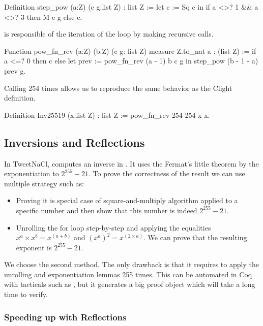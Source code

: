 \begin{coqD}
Definition step_pow (a:Z) (c g:list Z) : list Z :=
  let c := Sq c in
    if a <>? 1 && a <>? 3
    then M c g
    else c.
\end{coqD}

 is responsible of the iteration of the loop by making
recursive calls.
\begin{coqD}
Function pow_fn_rev (a:Z) (b:Z) (c g: list Z)
  {measure Z.to_nat a} : (list Z) :=
  if a <=? 0
    then c
    else
      let prev := pow_fn_rev (a - 1) b c g in
        step_pow (b - 1 - a) prev g.
\end{coqD}


Calling  254 times allows us to reproduce the same behavior as
the Clight definition.
\begin{coqD}
Definition Inv25519 (x:list Z) : list Z :=
  pow_fn_rev 254 254 x x.
\end{coqD}

\subsection{Inversions and Reflections}

In TweetNaCl,  computes an inverse in \Zfield. It uses the
Fermat's little theorem by the exponentiation to $2^{255}-21$. To prove the
correctness of the result we can use multiple strategy such as:
\begin{itemize}
  \item Proving it is special case of square-and-multiply algorithm applied to
  a specific number and then show that this number is indeed $2^{255}-21$.
  \item Unrolling the for loop step-by-step and applying the equalities
  $x^a \times x^b = x^{(a+b)}$ and $(x^a)^2 = x^{(2 \times a)}$. We can prove that
  the resulting exponent is $2^{255}-21$.
\end{itemize}

We choose the second method. The only drawback is that it requires to apply the
unrolling and exponentiation lemmas 255 times. This can be automated in Coq with
tacticals such as , but it generates a big proof object which
will take a long time to verify.

\subsubsection{Speeding up with Reflections}


